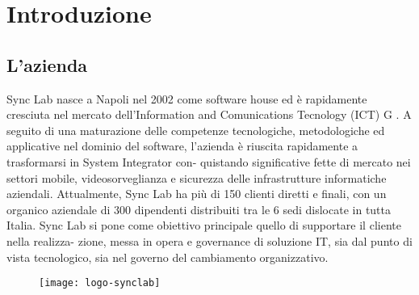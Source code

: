 
\chapter{Introduzione}
\label{cap:introduzione}





\section{L'azienda}

Sync Lab nasce a Napoli nel 2002 come software house ed è rapidamente cresciuta nel
mercato dell’Information and Comunications Tecnology (ICT) G . A seguito di una
maturazione delle competenze tecnologiche, metodologiche ed applicative nel dominio
del software, l’azienda è riuscita rapidamente a trasformarsi in System Integrator con-
quistando significative fette di mercato nei settori mobile, videosorveglianza e sicurezza
delle infrastrutture informatiche aziendali. Attualmente, Sync Lab ha più di 150 clienti
diretti e finali, con un organico aziendale di 300 dipendenti distribuiti tra le 6 sedi
dislocate in tutta Italia.
Sync Lab si pone come obiettivo principale quello di supportare il cliente nella realizza-
zione, messa in opera e governance di soluzione IT, sia dal punto di vista tecnologico,
sia nel governo del cambiamento organizzativo.

\begin{figure}[!h]
    \centering
    \texttt{[image: logo-synclab]}
\end{figure}

